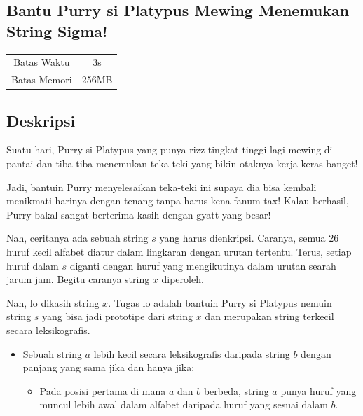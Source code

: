 \documentclass{article}
\begin{document}
\begin{center}
    \section*{Bantu Purry si Platypus Mewing Menemukan String Sigma!} %

    \begin{tabular}{ | c c | }
        \hline
        Batas Waktu  & 3s \\    %
        Batas Memori & 256MB \\  %
        \hline
    \end{tabular}
\end{center}

\subsection*{Deskripsi}

Suatu hari, Purry si Platypus yang punya rizz tingkat tinggi lagi mewing di pantai dan tiba-tiba menemukan teka-teki yang bikin otaknya kerja keras banget!

Jadi, bantuin Purry menyelesaikan teka-teki ini supaya dia bisa kembali menikmati harinya dengan tenang tanpa harus kena fanum tax! Kalau berhasil, Purry bakal sangat berterima kasih dengan gyatt yang besar!

Nah, ceritanya ada sebuah string $s$ yang harus dienkripsi. Caranya, semua 26 huruf kecil alfabet diatur dalam lingkaran dengan urutan tertentu. Terus, setiap huruf dalam $s$ diganti dengan huruf yang mengikutinya dalam urutan searah jarum jam. Begitu caranya string $x$ diperoleh.

Nah, lo dikasih string $x$. Tugas lo adalah bantuin Purry si Platypus nemuin string $s$ yang bisa jadi prototipe dari string $x$ dan merupakan string terkecil secara leksikografis.

\begin{itemize}
\item Sebuah string $a$ lebih kecil secara leksikografis daripada string $b$ dengan panjang yang sama jika dan hanya jika:
\begin{itemize}
\item Pada posisi pertama di mana $a$ dan $b$ berbeda, string $a$ punya huruf yang muncul lebih awal dalam alfabet daripada huruf yang sesuai dalam $b$.
\end{itemize}
\end{itemize}
\end{document}
